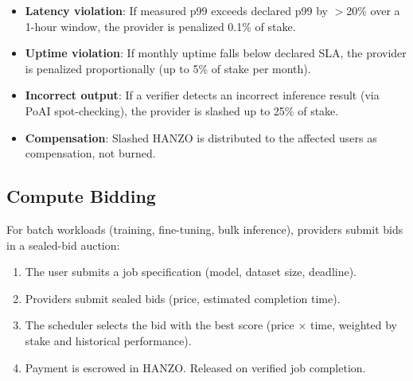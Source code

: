 \begin{itemize}[leftmargin=1.1em]
    \item \textbf{Latency violation}: If measured p99 exceeds declared p99 by
    $>$20\% over a 1-hour window, the provider is penalized 0.1\% of stake.
    \item \textbf{Uptime violation}: If monthly uptime falls below declared
    SLA, the provider is penalized proportionally (up to 5\% of stake per
    month).
    \item \textbf{Incorrect output}: If a verifier detects an incorrect
    inference result (via PoAI spot-checking), the provider is slashed up
    to 25\% of stake.
    \item \textbf{Compensation}: Slashed HANZO is distributed to the affected
    users as compensation, not burned.
\end{itemize}

\subsection{Compute Bidding}

For batch workloads (training, fine-tuning, bulk inference), providers submit
bids in a sealed-bid auction:

\begin{enumerate}[leftmargin=1.4em]
    \item The user submits a job specification (model, dataset size, deadline).
    \item Providers submit sealed bids (price, estimated completion time).
    \item The scheduler selects the bid with the best score (price $\times$
    time, weighted by stake and historical performance).
    \item Payment is escrowed in HANZO. Released on verified job completion.
\end{enumerate}


